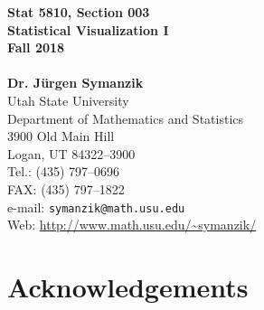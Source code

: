 \documentclass[12pt,letterpaper,final]{article}
\begin{document}





\begin{titlepage}
\vspace*{4.5cm}
\begin{center}
{\LARGE \bf Stat 5810, Section 003} \\[0.5cm]
{\LARGE \bf Statistical Visualization I} \\[0.5cm]
{\LARGE \bf Fall 2018} \\[0.5cm]
~ \\[2cm]
{\bf Dr. J\"urgen Symanzik} \\[0.3cm]
Utah State University \\[0.3cm]
Department of Mathematics and Statistics \\[0.3cm]
3900 Old Main Hill \\[0.3cm]
Logan, UT 84322--3900 \\[0.8cm]
Tel.: (435) 797--0696 \\[0.3cm]
FAX: (435) 797--1822 \\[0.3cm]
e-mail: \verb|symanzik@math.usu.edu| \\[0.3cm]
Web: \url{http://www.math.usu.edu/~symanzik/}
\end{center}

\thispagestyle{empty}
\vfill
\end{titlepage}

\newpage

\thispagestyle{empty}

\vspace*{5cm}



\newpage


\setcounter{page}{1}

\tableofcontents

\newpage

%


\section*{Acknowledgements}
\end{document}
